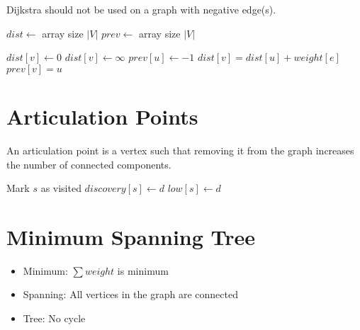 \documentclass{report}
\begin{document}
Dijkstra should not be used on a graph with negative edge(s).

\noindent \hrulefill
\begin{algorithmic}[1]
   
    \State $dist \gets$ array size $|V|$
    \State $prev \gets$ array size $|V|$

        $dist[v] \gets 0$
      \EndIf
        $dist[v] \gets \infty$
      \EndIf
      \State $prev[u] \gets -1$
    \EndFor
       
          \State $dist[v] = dist[u] + weight[e]$
          \State $prev[v] = u$
        \EndIf
      \EndFor
    \EndFor
     
        \State {}
        \State \Return{}
      \EndIf
    \EndFor
  \EndFunction
\end{algorithmic}
\noindent \hrulefill

\section{Articulation Points}

An articulation point is a vertex such that removing it from the graph increases the number of connected components.

\noindent \hrulefill
\begin{algorithmic}[1]
   
  \State Mark $s$ as visited
  \State $discovery[s] \gets d$
  \State $low[s] \gets d$
  \EndFunction
\end{algorithmic}
\noindent \hrulefill

\section{Minimum Spanning Tree}

\begin{itemize}
  \item Minimum: $\sum weight$ is minimum
  \item Spanning: All vertices in the graph are connected
  \item Tree: No cycle
\end{itemize}
\end{document}
